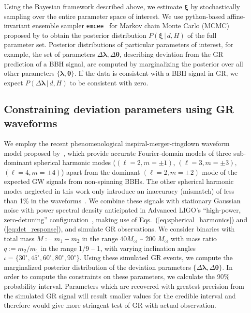 \documentclass[prd,preprintnumbers,twocolumn,eqsecnum,floatfix,a4paper,nofootinbib,superscriptaddress]{revtex4}
\newcommand{\blambda}{\bm{\lambda}}
\newcommand{\btheta}{\bm{\theta}}
\newcommand{\bxi}{\bm{\xi}}
\begin{document}
Using the Bayesian framework described above, we estimate $\bxi$ by stochastically sampling over the entire parameter space of interest. We use python-based affine-invariant ensemble sampler \texttt{emcee}~\cite{foreman2013emcee} for Markov chain Monte Carlo (MCMC) proposed by \cite{goodman2010ensemble} to obtain the posterior distribution $P(\bxi \, | \, d, H)$ of the full parameter set. Posterior distributions of particular parameters of interest, for example,  the set of parameters ${\Delta \blambda, \Delta \btheta}$, describing deviation from the GR prediction of a BBH signal, are computed  by marginalizing the posterior over all other parameters $\{\blambda, \btheta\}$. If the data is consistent with a BBH signal in GR, we expect $P(\Delta \blambda \, | \, d, H)$ to be consistent with zero. 

\subsection{Constraining deviation parameters  using GR waveforms}
We employ the recent phenomenological inspiral-merger-ringdown waveform model proposed by~\cite{Mehta:2017jpq}, which provide accurate Fourier-domain models of three sub-dominant spherical harmonic modes ($(\ell = 2, m=\pm1)$, $(\ell = 3, m=\pm3)$, $(\ell = 4, m = \pm4)$) apart from the dominant $(\ell = 2, m = \pm2)$ mode of the expected GW signals from non-spinning BBHs. The other spherical harmonic modes neglected in this work only introduce an inaccuracy (mismatch) of less than 1\% in the waveforms~\cite{Mehta:2017jpq}. We combine these signals with stationary Gaussian noise with power spectral density anticipated in Advanced LIGO's ``high-power, zero-detuning'' configuration~\cite{aLIGOZeroDetHighPower}, making use of Eqs.~(\ref{eq:spherical_harmonics}) and (\ref{eq:det_response}), and simulate GR observations. We consider binaries with total mass $M := m_1 + m_2$ in the range $40 M_\odot$ -- 200 $M_\odot$ with mass ratio $q := m_2/m_1$ in the range 1/9 -- 1, with varying inclination angles $\iota=\{30^{\circ},45^{\circ},60^{\circ},80^{\circ},90^{\circ}\}$. Using these simulated GR events, we compute the marginalized posterior distribution of the deviation parameters  $\{\Delta \blambda, \Delta \btheta\}$. In order to compute the constraints on these parameters, we calculate the 90\% probability interval. Parameters which are recovered with greatest precision from the simulated GR signal will result smaller values for the credible interval and therefore would give more stringent test of GR with actual observation.
\end{document}
